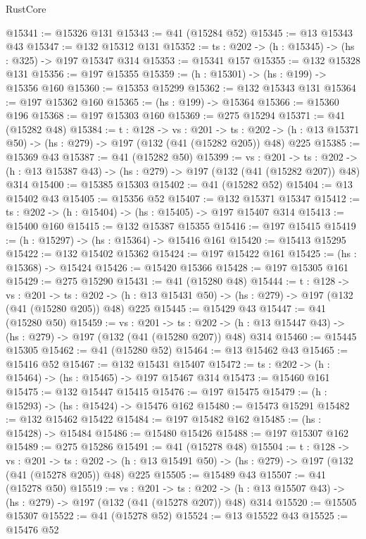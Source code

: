 \begin{lexlean}{RustCore}
\begin{coremodule}
@15341 := @15326 @131
@15343 := @41 (@15284 @52)
@15345 := @13 @15343 @43
@15347 := @132 @15312 @131
@15352 := {ts : @202} -> (h : @15345) -> (hs : @325) -> @197 @15347 @314
@15353 := @15341 @157
@15355 := @132 @15328 @131
@15356 := @197 @15355
@15359 := (h : @15301) -> (hs : @199) -> @15356 @160
@15360 := @15353 @15299
@15362 := @132 @15343 @131
@15364 := @197 @15362 @160
@15365 := (hs : @199) -> @15364
@15366 := @15360 @196
@15368 := @197 @15303 @160
@15369 := @275 @15294
@15371 := @41 (@15282 @48)
@15384 := {t : @128} ->
  {vs : @201} ->
  {ts : @202} -> (h : @13 @15371 @50) -> (hs : @279) -> @197 (@132 (@41 (@15282 @205)) @48) @225
@15385 := @15369 @43
@15387 := @41 (@15282 @50)
@15399 := {vs : @201} ->
  {ts : @202} -> (h : @13 @15387 @43) -> (hs : @279) -> @197 (@132 (@41 (@15282 @207)) @48) @314
@15400 := @15385 @15303
@15402 := @41 (@15282 @52)
@15404 := @13 @15402 @43
@15405 := @15356 @52
@15407 := @132 @15371 @15347
@15412 := {ts : @202} -> (h : @15404) -> (hs : @15405) -> @197 @15407 @314
@15413 := @15400 @160
@15415 := @132 @15387 @15355
@15416 := @197 @15415
@15419 := (h : @15297) -> (hs : @15364) -> @15416 @161
@15420 := @15413 @15295
@15422 := @132 @15402 @15362
@15424 := @197 @15422 @161
@15425 := (hs : @15368) -> @15424
@15426 := @15420 @15366
@15428 := @197 @15305 @161
@15429 := @275 @15290
@15431 := @41 (@15280 @48)
@15444 := {t : @128} ->
  {vs : @201} ->
  {ts : @202} -> (h : @13 @15431 @50) -> (hs : @279) -> @197 (@132 (@41 (@15280 @205)) @48) @225
@15445 := @15429 @43
@15447 := @41 (@15280 @50)
@15459 := {vs : @201} ->
  {ts : @202} -> (h : @13 @15447 @43) -> (hs : @279) -> @197 (@132 (@41 (@15280 @207)) @48) @314
@15460 := @15445 @15305
@15462 := @41 (@15280 @52)
@15464 := @13 @15462 @43
@15465 := @15416 @52
@15467 := @132 @15431 @15407
@15472 := {ts : @202} -> (h : @15464) -> (hs : @15465) -> @197 @15467 @314
@15473 := @15460 @161
@15475 := @132 @15447 @15415
@15476 := @197 @15475
@15479 := (h : @15293) -> (hs : @15424) -> @15476 @162
@15480 := @15473 @15291
@15482 := @132 @15462 @15422
@15484 := @197 @15482 @162
@15485 := (hs : @15428) -> @15484
@15486 := @15480 @15426
@15488 := @197 @15307 @162
@15489 := @275 @15286
@15491 := @41 (@15278 @48)
@15504 := {t : @128} ->
  {vs : @201} ->
  {ts : @202} -> (h : @13 @15491 @50) -> (hs : @279) -> @197 (@132 (@41 (@15278 @205)) @48) @225
@15505 := @15489 @43
@15507 := @41 (@15278 @50)
@15519 := {vs : @201} ->
  {ts : @202} -> (h : @13 @15507 @43) -> (hs : @279) -> @197 (@132 (@41 (@15278 @207)) @48) @314
@15520 := @15505 @15307
@15522 := @41 (@15278 @52)
@15524 := @13 @15522 @43
@15525 := @15476 @52

\end{coremodule}
\end{lexlean}

